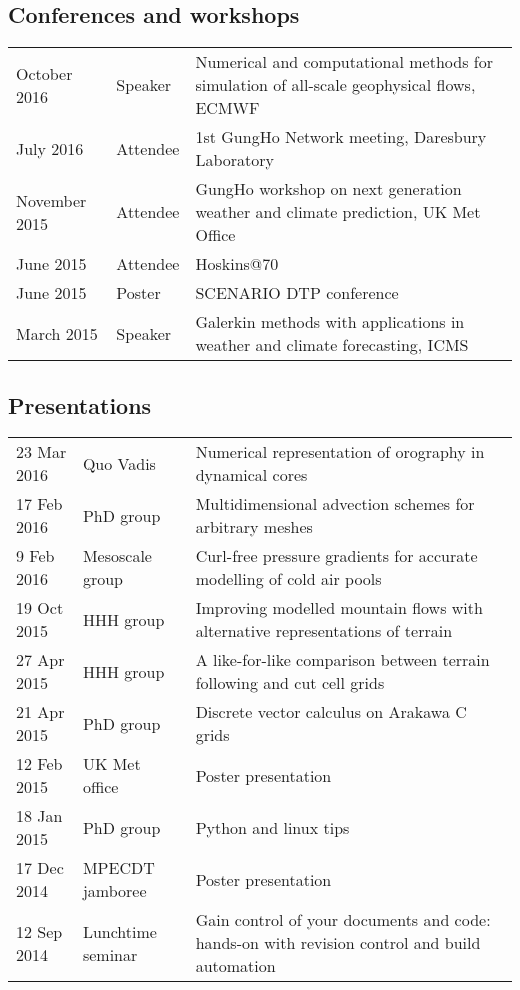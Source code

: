 \documentclass[a4paper,11pt]{article}
\begin{document}
\subsection*{Conferences and workshops}
\begin{tabularx}{\linewidth}{l l X}
October 2016 & Speaker & Numerical and computational methods for simulation of all-scale geophysical flows, ECMWF \\
July 2016 & Attendee & 1st GungHo Network meeting, Daresbury Laboratory \\
November 2015 & Attendee & GungHo workshop on next generation weather and climate prediction, UK Met Office \\
June 2015 & Attendee & Hoskins@70 \\
June 2015 & Poster & SCENARIO DTP conference \\
March 2015 & Speaker & Galerkin methods with applications in weather and climate forecasting, ICMS \\
\end{tabularx}

\subsection*{Presentations}
\begin{tabularx}{\linewidth}{l l X}
23 Mar 2016 & Quo Vadis & Numerical representation of orography in dynamical cores \\
17 Feb 2016 & PhD group & Multidimensional advection schemes for arbitrary meshes \\
9 Feb 2016 & Mesoscale group & Curl-free pressure gradients for accurate modelling of cold air pools \\
19 Oct 2015 & HHH group & Improving modelled mountain flows with alternative representations of terrain \\
27 Apr 2015 & HHH group & A like-for-like comparison between terrain following and cut cell grids \\
21 Apr 2015 & PhD group & Discrete vector calculus on Arakawa C grids \\
12 Feb 2015 & UK Met office & Poster presentation \\
18 Jan 2015 & PhD group & Python and linux tips \\
17 Dec 2014 & MPECDT jamboree & Poster presentation \\
12 Sep 2014 & Lunchtime seminar  & Gain control of your documents and code: hands-on with revision control and build automation \\
\end{tabularx}
\end{document}
